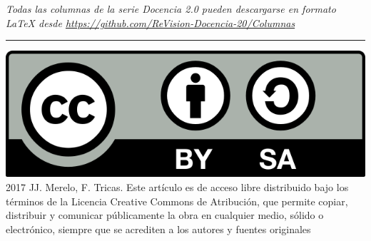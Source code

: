 \documentclass[twoside,10pt]{article}
\newcommand{\surl}[1]{{\small\url{#1}}}
\begin{document}
\begin{multicols}{2}
\medskip

\noindent\emph{Todas las columnas de la serie Docencia 2.0
pueden descargarse en formato LaTeX desde
\surl{https://github.com/ReVision-Docencia-20/Columnas}}

\noindent\rule{90mm}{1pt}

{\small \noindent\includegraphics[height = 4ex]{CC.png} 2017 JJ.
Merelo, F. Tricas. Este artículo es de acceso libre distribuido bajo
los términos
de la Licencia Creative Commons de Atribución, que permite copiar,
distribuir y comunicar públicamente la obra en cualquier medio, sólido
o electrónico, siempre que se acrediten a los autores y fuentes
originales}

\end{multicols}
\end{document}
